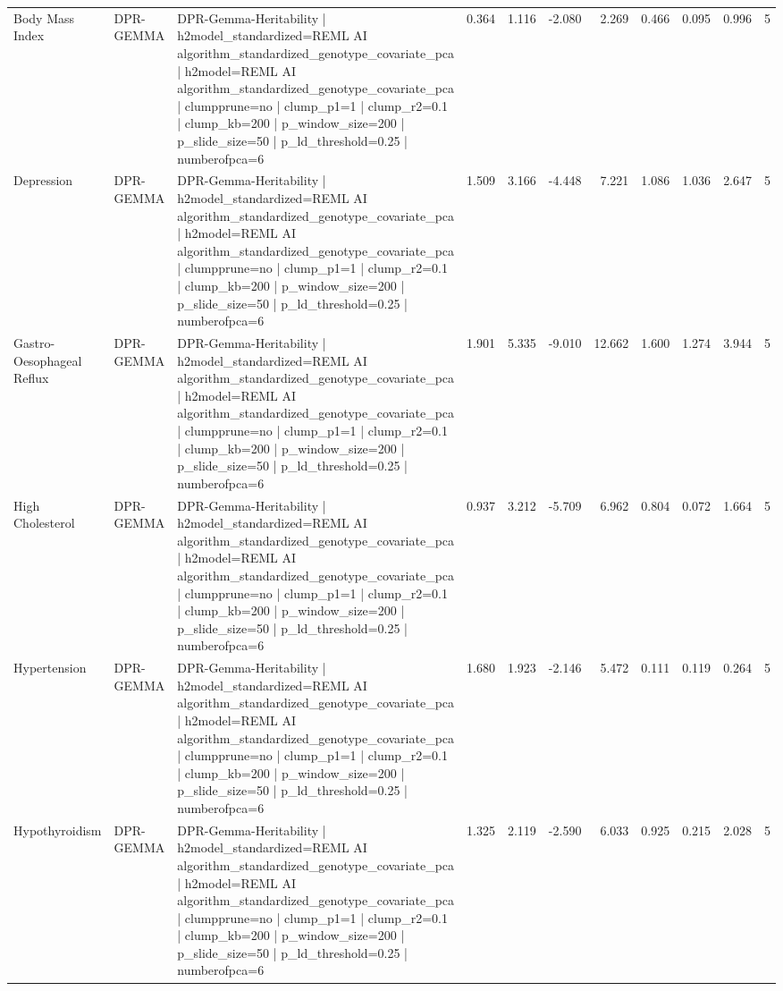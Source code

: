 \begin{landscape}
\begin{longtable}{p{2.4cm}p{1.8cm}p{6.0cm}rrrrrrrr}
Body Mass Index & DPR-GEMMA & DPR-Gemma-Heritability | h2model\_standardized=REML AI algorithm\_standardized\_genotype\_covariate\_pca | h2model=REML AI algorithm\_standardized\_genotype\_covariate\_pca | clumpprune=no | clump\_p1=1 | clump\_r2=0.1 | clump\_kb=200 | p\_window\_size=200 | p\_slide\_size=50 | p\_ld\_threshold=0.25 | numberofpca=6 & 0.364 & 1.116 & -2.080 & 2.269 & 0.466 & 0.095 & 0.996 & 5 \\
Depression & DPR-GEMMA & DPR-Gemma-Heritability | h2model\_standardized=REML AI algorithm\_standardized\_genotype\_covariate\_pca | h2model=REML AI algorithm\_standardized\_genotype\_covariate\_pca | clumpprune=no | clump\_p1=1 | clump\_r2=0.1 | clump\_kb=200 | p\_window\_size=200 | p\_slide\_size=50 | p\_ld\_threshold=0.25 | numberofpca=6 & 1.509 & 3.166 & -4.448 & 7.221 & 1.086 & 1.036 & 2.647 & 5 \\
Gastro-Oesophageal Reflux & DPR-GEMMA & DPR-Gemma-Heritability | h2model\_standardized=REML AI algorithm\_standardized\_genotype\_covariate\_pca | h2model=REML AI algorithm\_standardized\_genotype\_covariate\_pca | clumpprune=no | clump\_p1=1 | clump\_r2=0.1 | clump\_kb=200 | p\_window\_size=200 | p\_slide\_size=50 | p\_ld\_threshold=0.25 | numberofpca=6 & 1.901 & 5.335 & -9.010 & 12.662 & 1.600 & 1.274 & 3.944 & 5 \\
High Cholesterol & DPR-GEMMA & DPR-Gemma-Heritability | h2model\_standardized=REML AI algorithm\_standardized\_genotype\_covariate\_pca | h2model=REML AI algorithm\_standardized\_genotype\_covariate\_pca | clumpprune=no | clump\_p1=1 | clump\_r2=0.1 | clump\_kb=200 | p\_window\_size=200 | p\_slide\_size=50 | p\_ld\_threshold=0.25 | numberofpca=6 & 0.937 & 3.212 & -5.709 & 6.962 & 0.804 & 0.072 & 1.664 & 5 \\
Hypertension & DPR-GEMMA & DPR-Gemma-Heritability | h2model\_standardized=REML AI algorithm\_standardized\_genotype\_covariate\_pca | h2model=REML AI algorithm\_standardized\_genotype\_covariate\_pca | clumpprune=no | clump\_p1=1 | clump\_r2=0.1 | clump\_kb=200 | p\_window\_size=200 | p\_slide\_size=50 | p\_ld\_threshold=0.25 | numberofpca=6 & 1.680 & 1.923 & -2.146 & 5.472 & 0.111 & 0.119 & 0.264 & 5 \\
Hypothyroidism & DPR-GEMMA & DPR-Gemma-Heritability | h2model\_standardized=REML AI algorithm\_standardized\_genotype\_covariate\_pca | h2model=REML AI algorithm\_standardized\_genotype\_covariate\_pca | clumpprune=no | clump\_p1=1 | clump\_r2=0.1 | clump\_kb=200 | p\_window\_size=200 | p\_slide\_size=50 | p\_ld\_threshold=0.25 | numberofpca=6 & 1.325 & 2.119 & -2.590 & 6.033 & 0.925 & 0.215 & 2.028 & 5 \\

\end{longtable}
\end{landscape}
